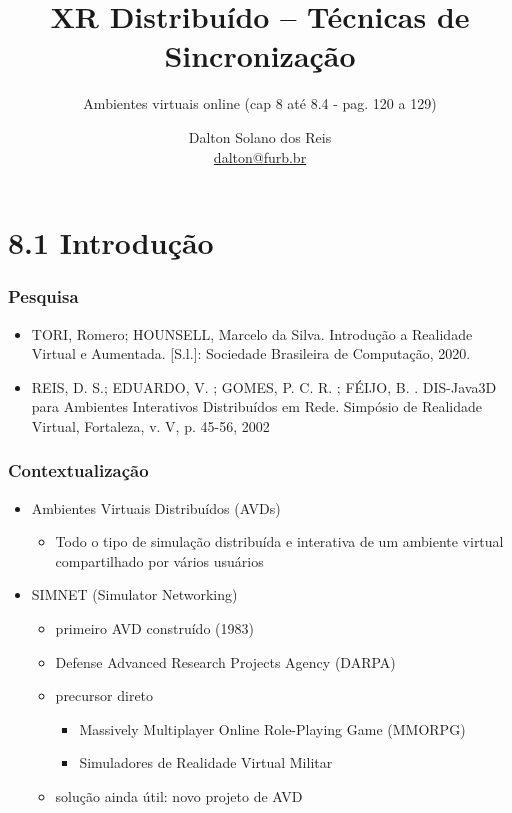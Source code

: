 \documentclass{beamer}
\title[XR Distribuído – Técnicas de Sincronização]{XR Distribuído – Técnicas de Sincronização}
\subtitle{Ambientes virtuais online (cap 8 até 8.4 - pag. 120 a 129)}
\author[Dalton Solano dos Reis]{
  Dalton Solano dos Reis\texorpdfstring{\\\medskip}{}%
  {\small \href{mailto:dalton@furb.br}{dalton@furb.br}}}
\institute[UDESC]{
  Centro de Ciências e Tecnológicas\\
  Universidade do Estado de Santa Catarina}
\begin{document}
\begin{frame}
  \titlepage

\end{frame}

\section{8.1 Introdução}

\begin{frame}
  \frametitle{Pesquisa}
  \begin{itemize}
    \item TORI, Romero; HOUNSELL, Marcelo da Silva. Introdução a Realidade Virtual e Aumentada. [S.l.]: Sociedade Brasileira de Computação, 2020. 
    \item REIS, D. S.; EDUARDO, V. ; GOMES, P. C. R. ; FÉIJO, B. . DIS-Java3D para Ambientes Interativos Distribuídos em Rede. Simpósio de Realidade Virtual, Fortaleza, v. V, p. 45-56, 2002
  \end{itemize}
\end{frame}

\begin{frame}
  \frametitle{Contextualização}
    \begin{itemize}
      \item Ambientes Virtuais Distribuídos (AVDs)
      \begin{itemize}
        \item Todo o tipo de simulação distribuída e interativa de um ambiente virtual compartilhado por vários usuários
      \end{itemize}
      \item SIMNET (Simulator Networking)
      \begin{itemize}
        \item primeiro AVD construído (1983)
        \item Defense Advanced Research Projects Agency (DARPA)
        \item precursor direto
        \begin{itemize}
          \item Massively Multiplayer Online Role-Playing Game (MMORPG)
          \item Simuladores de Realidade Virtual Militar
        \end{itemize}
        \item solução ainda útil: novo projeto de AVD
      \end{itemize} 
    \end{itemize}
\end{frame}
\end{document}

